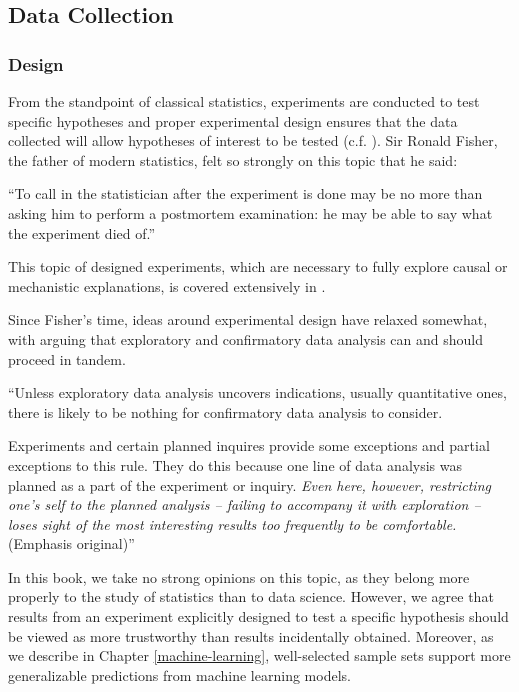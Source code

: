 \documentclass[
]{krantz}
\renewenvironment{quote}{\begin{VF}}{\end{VF}}
\begin{document}
\hypertarget{data-collection2}{%
\subsection{Data Collection}\label{data-collection2}}

\hypertarget{design}{%
\subsubsection*{Design}\label{design}}


From the standpoint of classical statistics, experiments are conducted to test specific hypotheses and proper experimental design ensures that the data collected will allow hypotheses of interest to be tested (c.f. \citet{Fisher1935}). Sir Ronald Fisher, the father of modern statistics, felt so strongly on this topic that he said:

\begin{quote}
``To call in the statistician after the experiment is done may be no more than asking him to perform a postmortem examination: he may be able to say what the experiment died of.''
\end{quote}

This topic of designed experiments, which are necessary to fully explore causal or mechanistic explanations, is covered extensively in \citet{Lawson2014}.

Since Fisher's time, ideas around experimental design have relaxed somewhat, with \citet{Tukey1977} arguing that exploratory and confirmatory data analysis can and should proceed in tandem.

\begin{quote}
``Unless exploratory data analysis uncovers indications, usually quantitative ones, there is likely to be nothing for confirmatory data analysis to consider.

Experiments and certain planned inquires provide some exceptions and partial exceptions to this rule. They do this because one line of data analysis was planned as a part of the experiment or inquiry. \emph{Even here, however, restricting one's self to the planned analysis -- failing to accompany it with exploration -- loses sight of the most interesting results too frequently to be comfortable.} (Emphasis original)''
\end{quote}

In this book, we take no strong opinions on this topic, as they belong more properly to the study of statistics than to data science. However, we agree that results from an experiment explicitly designed to test a specific hypothesis should be viewed as more trustworthy than results incidentally obtained. Moreover, as we describe in Chapter \ref{machine-learning}, well-selected sample sets support more generalizable predictions from machine learning models.
\end{document}
